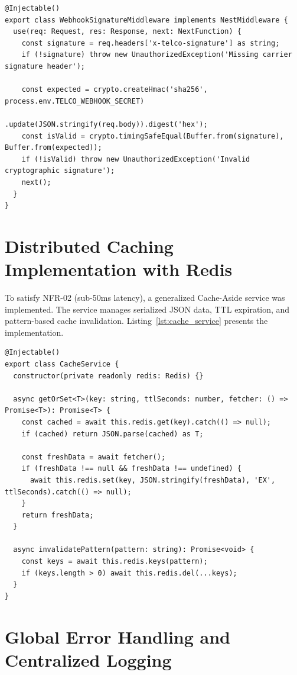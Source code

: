 \begin{lstlisting}[caption={HMAC-SHA256 Webhook Verification Middleware.}, label={lst:webhook_verifier}]
@Injectable()
export class WebhookSignatureMiddleware implements NestMiddleware {
  use(req: Request, res: Response, next: NextFunction) {
    const signature = req.headers['x-telco-signature'] as string;
    if (!signature) throw new UnauthorizedException('Missing carrier signature header');

    const expected = crypto.createHmac('sha256', process.env.TELCO_WEBHOOK_SECRET)
                           .update(JSON.stringify(req.body)).digest('hex');
    const isValid = crypto.timingSafeEqual(Buffer.from(signature), Buffer.from(expected));
    if (!isValid) throw new UnauthorizedException('Invalid cryptographic signature');
    next();
  }
}
\end{lstlisting}

\section{Distributed Caching Implementation with Redis}
\label{sec:impl_caching}

To satisfy NFR-02 (sub-50ms latency), a generalized Cache-Aside service was implemented. The service manages serialized JSON data, TTL expiration, and pattern-based cache invalidation. Listing~\ref{lst:cache_service} presents the implementation.

\begin{lstlisting}[caption={Redis Cache-Aside Service Implementation.}, label={lst:cache_service}]
@Injectable()
export class CacheService {
  constructor(private readonly redis: Redis) {}

  async getOrSet<T>(key: string, ttlSeconds: number, fetcher: () => Promise<T>): Promise<T> {
    const cached = await this.redis.get(key).catch(() => null);
    if (cached) return JSON.parse(cached) as T;

    const freshData = await fetcher();
    if (freshData !== null && freshData !== undefined) {
      await this.redis.set(key, JSON.stringify(freshData), 'EX', ttlSeconds).catch(() => null);
    }
    return freshData;
  }

  async invalidatePattern(pattern: string): Promise<void> {
    const keys = await this.redis.keys(pattern);
    if (keys.length > 0) await this.redis.del(...keys);
  }
}
\end{lstlisting}

\section{Global Error Handling and Centralized Logging}
\label{sec:impl_error_logging}

